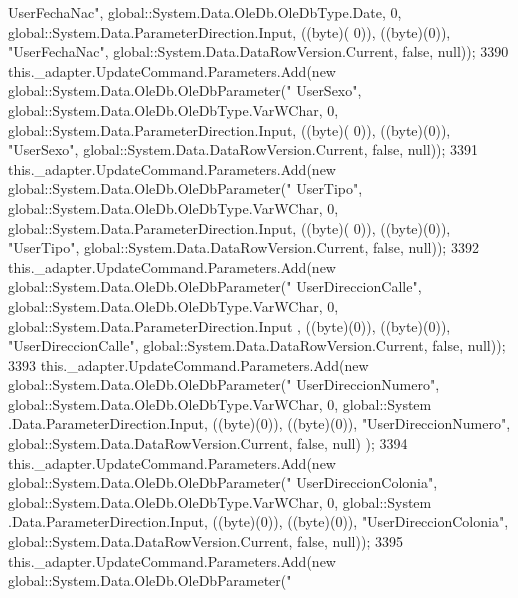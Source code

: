 \begin{DoxyCode}
{      UserFechaNac"}, global::System.Data.OleDb.OleDbType.Date, 0, global::System.Data.ParameterDirection.Input, ((byte)(
      0)), ((byte)(0)), \textcolor{stringliteral}{"UserFechaNac"}, global::System.Data.DataRowVersion.Current, \textcolor{keyword}{false}, null));
3390             this.\_adapter.UpdateCommand.Parameters.Add(\textcolor{keyword}{new} global::System.Data.OleDb.OleDbParameter(\textcolor{stringliteral}{"
      UserSexo"}, global::System.Data.OleDb.OleDbType.VarWChar, 0, global::System.Data.ParameterDirection.Input, ((byte)(
      0)), ((byte)(0)), \textcolor{stringliteral}{"UserSexo"}, global::System.Data.DataRowVersion.Current, \textcolor{keyword}{false}, null));
3391             this.\_adapter.UpdateCommand.Parameters.Add(\textcolor{keyword}{new} global::System.Data.OleDb.OleDbParameter(\textcolor{stringliteral}{"
      UserTipo"}, global::System.Data.OleDb.OleDbType.VarWChar, 0, global::System.Data.ParameterDirection.Input, ((byte)(
      0)), ((byte)(0)), \textcolor{stringliteral}{"UserTipo"}, global::System.Data.DataRowVersion.Current, \textcolor{keyword}{false}, null));
3392             this.\_adapter.UpdateCommand.Parameters.Add(\textcolor{keyword}{new} global::System.Data.OleDb.OleDbParameter(\textcolor{stringliteral}{"
      UserDireccionCalle"}, global::System.Data.OleDb.OleDbType.VarWChar, 0, global::System.Data.ParameterDirection.Input
      , ((byte)(0)), ((byte)(0)), \textcolor{stringliteral}{"UserDireccionCalle"}, global::System.Data.DataRowVersion.Current, \textcolor{keyword}{false}, null));
3393             this.\_adapter.UpdateCommand.Parameters.Add(\textcolor{keyword}{new} global::System.Data.OleDb.OleDbParameter(\textcolor{stringliteral}{"
      UserDireccionNumero"}, global::System.Data.OleDb.OleDbType.VarWChar, 0, global::System
      .Data.ParameterDirection.Input, ((byte)(0)), ((byte)(0)), \textcolor{stringliteral}{"UserDireccionNumero"}, global::System.Data.DataRowVersion.Current, \textcolor{keyword}{false}, null)
      );
3394             this.\_adapter.UpdateCommand.Parameters.Add(\textcolor{keyword}{new} global::System.Data.OleDb.OleDbParameter(\textcolor{stringliteral}{"
      UserDireccionColonia"}, global::System.Data.OleDb.OleDbType.VarWChar, 0, global::System
      .Data.ParameterDirection.Input, ((byte)(0)), ((byte)(0)), \textcolor{stringliteral}{"UserDireccionColonia"}, global::System.Data.DataRowVersion.Current, \textcolor{keyword}{false}, 
      null));
3395             this.\_adapter.UpdateCommand.Parameters.Add(\textcolor{keyword}{new} global::System.Data.OleDb.OleDbParameter(\textcolor{stringliteral}{"
}
\end{DoxyCode}
